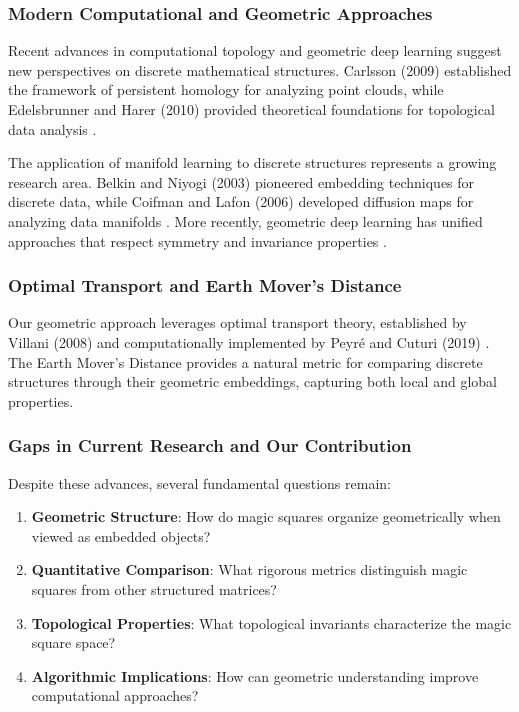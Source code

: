 \subsubsection{Modern Computational and Geometric Approaches}

Recent advances in computational topology and geometric deep learning suggest new perspectives on discrete mathematical structures. Carlsson (2009) established the framework of persistent homology for analyzing point clouds, while Edelsbrunner and Harer (2010) provided theoretical foundations for topological data analysis \citep{Carlsson2009, Edelsbrunner2010}.

The application of manifold learning to discrete structures represents a growing research area. Belkin and Niyogi (2003) pioneered embedding techniques for discrete data, while Coifman and Lafon (2006) developed diffusion maps for analyzing data manifolds \citep{Belkin2003, Coifman2006}. More recently, geometric deep learning has unified approaches that respect symmetry and invariance properties \citep{Bronstein2021}.

\subsubsection{Optimal Transport and Earth Mover's Distance}

Our geometric approach leverages optimal transport theory, established by Villani (2008) and computationally implemented by Peyré and Cuturi (2019) \citep{Villani2008, Peyre2019}. The Earth Mover's Distance provides a natural metric for comparing discrete structures through their geometric embeddings, capturing both local and global properties.

\subsubsection{Gaps in Current Research and Our Contribution}

Despite these advances, several fundamental questions remain:

\begin{enumerate}
    \item \textbf{Geometric Structure}: How do magic squares organize geometrically when viewed as embedded objects?
    \item \textbf{Quantitative Comparison}: What rigorous metrics distinguish magic squares from other structured matrices?
    \item \textbf{Topological Properties}: What topological invariants characterize the magic square space?
    \item \textbf{Algorithmic Implications}: How can geometric understanding improve computational approaches?
\end{enumerate}


